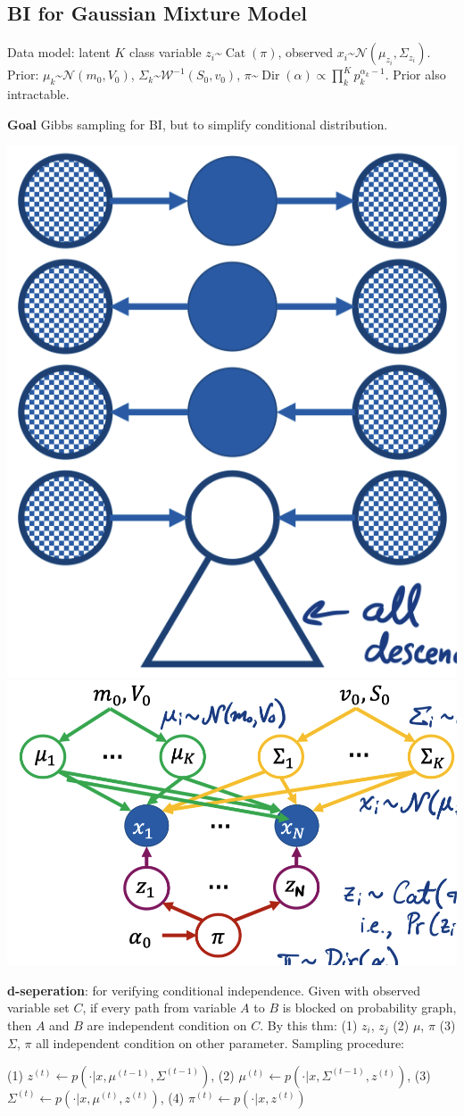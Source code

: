\subsection*{BI for Gaussian Mixture Model}
Data model: latent $K$ class variable $z_i $\textasciitilde$ \operatorname{Cat}(\pi)$, observed $x_i$\textasciitilde$ \mathcal{N}(\mu_{z_i}, \Sigma_{z_i})$. Prior: $\mu_k $\textasciitilde$ \mathcal{N}(m_0,V_0)$, $\Sigma_k $\textasciitilde$ \mathcal{W}^{-1}(S_0, v_0)$, $\pi$\textasciitilde$ \operatorname{Dir}(\alpha)\propto\prod_k^{K} p_{k}^{\alpha_k-1}$. Prior also intractable. 

\textbf{Goal} Gibbs sampling for BI, but to simplify conditional distribution.
\vspace{-0.3cm}
\begin{center}
    \includegraphics[width=0.3\columnwidth]{figures/d-sep.png}
    \includegraphics[width=0.50\columnwidth]{figures/GMM.png}
\end{center}
\vspace{-0.4cm}

\textbf{d-seperation}: for verifying conditional independence. Given with observed variable set $C$, if every path from variable $A$ to $B$ is blocked on probability graph, then $A$ and $B$ are independent condition on $C$. By this thm: (1) $z_i$, $z_j$ (2) $\mu$, $\pi$  (3) $\Sigma$, $\pi$ all independent condition on other parameter. Sampling procedure: \begin{scriptsize}
    (1) $z^{(t)} \leftarrow p\left(\cdot | x, \mu^{(t-1)}, \Sigma^{(t-1)}\right)$, (2) $\mu^{(t)} \leftarrow p\left(\cdot | x, \Sigma^{(t-1)}, z^{(t)}\right)$, (3) $\Sigma^{(t)} \leftarrow p\left(\cdot | x, \mu^{(t)}, z^{(t)}\right)$, (4) $\pi^{(t)} \leftarrow p\left(\cdot | x, z^{(t)}\right)$
\end{scriptsize}

